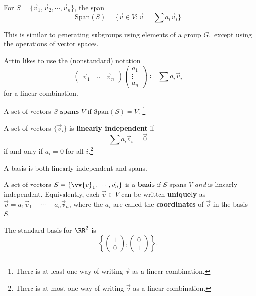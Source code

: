 \begin{definition}
For $S = \{\vec{v}_1, \vec{v}_2, \cdots, \vec{v}_n\}$, the span 
\[
\text{Span}(S) = \{\vec{v} \in V: \vec{v} = \sum a_i \vec{v}_i\}
\]
\end{definition}

This is similar to generating subgroups using elements of a group $G,$ except using the operations of vector spaces.

Artin likes to use the (nonstandard) notation 
\[
\begin{pmatrix}
\vec{v}_1 & \cdots & \vec{v}_n
\end{pmatrix}
\begin{pmatrix}
a_1 \\
\vdots \\
a_n
\end{pmatrix}
\coloneqq \sum a_i \vec{v}_i
\]
for a linear combination. 

\begin{definition}
A set of vectors $S$ \textbf{spans} $V$ if $\text{Span}(S) = V.$ \footnote{There is at least one way of writing $\vec{v}$ as a linear combination.}
\end{definition}

\begin{definition}
A set of vectors $\{\vec{v}_i\}$ is \textbf{linearly independent} if 
\[
\sum a_i \vec{v}_i = \vec{0}
\]
if and only if $a_i = 0$ for all $i.$\footnote{There is at most one way of writing $\vec{v}$ as a linear combination.}

\end{definition}

A basis is both linearly independent and spans.
\begin{definition}
A set of vectors $S = \{\vv{v}_1, \cdots, \vec{v}_n\}$ is a \textbf{basis} if $S$ spans $V$ \emph{and} is linearly independent. Equivalently, each $\vec{v} \in V$ can be written \textbf{uniquely} as $\vec{v} = a_1\vec{v}_1 + \cdots + a_n \vec{v}_n$, where the $a_i$ are called the \textbf{coordinates} of $\vec{v}$ in the basis $S.$
\end{definition}

The standard basis for $\RR^2$ is 
\[
\left\{
\begin{pmatrix}
1 \\
0
\end{pmatrix}, 
\begin{pmatrix}
0 \\
1
\end{pmatrix}\right\}.
\]

